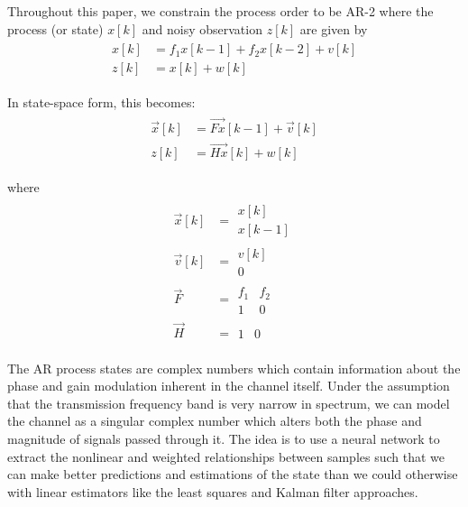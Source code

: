 \documentclass[twocolumn,letterpaper]{IEEEAerospaceCLS}  %
\begin{document}
Throughout this paper, we constrain the process order to be AR-2 where the process (or state) $x[k]$ and noisy observation $z[k]$ are given by
\begin{align}
\begin{aligned}
x[k]&= f_1x[k-1]+ f_2x[k-2] + v[k]\\
z[k]&= x[k] + w[k]
\end{aligned}
\end{align}

In state-space form, this becomes:
\begin{align}
\begin{aligned}
\vec{x}[k]&=\vec{Fx}[k-1]+\vec{v}[k]\\
z[k]&=\vec{Hx}[k]+w[k]
\end{aligned}
\end{align}

where
\begin{align}
\begin{aligned}
\vec{x}[k]&=\begin{matrix}    x[k]\\ x[k-1] \end{matrix}\\
\vec{v}[k]&= \begin{matrix} v[k]\\ 0 \end{matrix}\\
\vec{F}&= \begin{matrix}    f_1       & f_2 \\ 1       & 0 \end{matrix}\\
\vec{H}&= \begin{matrix} 1       & 0  \end{matrix}
\end{aligned}
\end{align}

The AR process states are complex numbers which contain information about the phase and gain modulation inherent in the channel itself. Under the assumption that the transmission frequency band is very narrow in spectrum, we can model the channel as a singular complex number which alters both the phase and magnitude of signals passed through it. The idea is to use a neural network to extract the nonlinear and weighted relationships between samples such that we can make better predictions and estimations of the state than we could otherwise with linear estimators like the least squares and Kalman filter approaches. 
\end{document}
